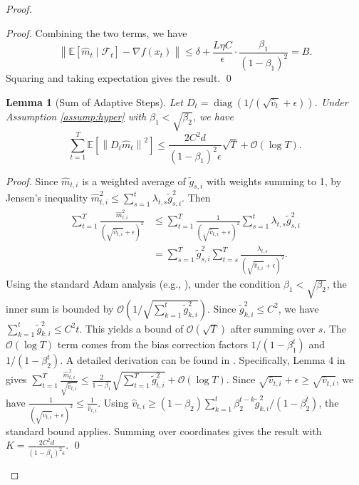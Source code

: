 \documentclass{article}
\newtheorem{lemma}{Lemma}
\newcommand{\E}{\mathbb{E}}
\newcommand{\norm}[1]{\left\| #1 \right\|}
\begin{document}
\begin{proof}
\begin{proof}
    Combining the two terms, we have
    \[
        \norm{\E[\hat{m}_t \mid \mathcal{F}_t] - \nabla f(x_t)} \le \delta + \frac{L \eta C}{\epsilon} \cdot \frac{\beta_1}{(1-\beta_1)^2} = B.
    \]
    Squaring and taking expectation gives the result. \qed
\end{proof}

\begin{lemma}[Sum of Adaptive Steps] \label{lem:sum_adaptive}
    Let $D_t = \operatorname{diag}(1/(\sqrt{\hat{v}_t}+\epsilon))$. Under Assumption \ref{assump:hyper} with $\beta_1 < \sqrt{\beta_2}$, we have
    \[
        \sum_{t=1}^T \E[\norm{D_t \hat{m}_t}^2] \le \frac{2 C^2 d}{(1-\beta_1)^2 \epsilon} \sqrt{T} + \mathcal{O}(\log T).
    \]
\end{lemma}
\begin{proof}
    Since $\hat{m}_{t,i}$ is a weighted average of $\tilde{g}_{s,i}$ with weights summing to 1, by Jensen's inequality $\hat{m}_{t,i}^2 \le \sum_{s=1}^t \lambda_{t,s} \tilde{g}_{s,i}^2$. Then
    \begin{align*}
        \sum_{t=1}^T \frac{\hat{m}_{t,i}^2}{(\sqrt{\hat{v}_{t,i}}+\epsilon)^2}
        &\le \sum_{t=1}^T \frac{1}{(\sqrt{\hat{v}_{t,i}}+\epsilon)^2} \sum_{s=1}^t \lambda_{t,s} \tilde{g}_{s,i}^2 \\
        &= \sum_{s=1}^T \tilde{g}_{s,i}^2 \sum_{t=s}^T \frac{\lambda_{t,s}}{(\sqrt{\hat{v}_{t,i}}+\epsilon)^2}.
    \end{align*}
    Using the standard Adam analysis (e.g., \cite{reddi2018convergence, zaheer2018adaptive}), under the condition $\beta_1 < \sqrt{\beta_2}$, the inner sum is bounded by $\mathcal{O}(1/\sqrt{\sum_{k=1}^t \tilde{g}_{k,i}^2})$. Since $\tilde{g}_{k,i}^2 \le C^2$, we have $\sum_{k=1}^t \tilde{g}_{k,i}^2 \le C^2 t$. This yields a bound of $\mathcal{O}(\sqrt{T})$ after summing over $s$. The $\mathcal{O}(\log T)$ term comes from the bias correction factors $1/(1-\beta_1^t)$ and $1/(1-\beta_2^t)$. A detailed derivation can be found in \cite{zaheer2018adaptive}. Specifically, Lemma 4 in \cite{zaheer2018adaptive} gives $\sum_{t=1}^T \frac{\hat{m}_{t,i}^2}{\sqrt{\hat{v}_{t,i}}} \le \frac{2}{1-\beta_1} \sqrt{\sum_{t=1}^T \tilde{g}_{t,i}^2} + \mathcal{O}(\log T)$. Since $\sqrt{\hat{v}_{t,i}}+\epsilon \ge \sqrt{\hat{v}_{t,i}}$, we have $\frac{1}{(\sqrt{\hat{v}_{t,i}}+\epsilon)^2} \le \frac{1}{\hat{v}_{t,i}}$. Using $\hat{v}_{t,i} \ge (1-\beta_2) \sum_{k=1}^t \beta_2^{t-k} \tilde{g}_{k,i}^2 / (1-\beta_2^t)$, the standard bound applies. Summing over coordinates gives the result with $K = \frac{2 C^2 d}{(1-\beta_1)^2 \epsilon}$. \qed
\end{proof}


\end{proof}
\end{document}
